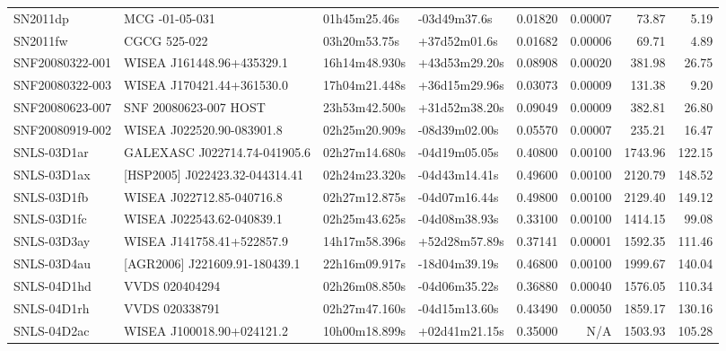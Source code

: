 \begin{longtable}{llllrrrr}
SN2011dp         &                  MCG -01-05-031 &    01h45m25.46s &    -03d49m37.6s &  0.01820 &  0.00007 &    73.87 &        5.19 \\
SN2011fw         &                    CGCG 525-022 &    03h20m53.75s &    +37d52m01.6s &  0.01682 &  0.00006 &    69.71 &        4.89 \\
SNF20080322-001  &       WISEA J161448.96+435329.1 &   16h14m48.930s &   +43d53m29.20s &  0.08908 &  0.00020 &   381.98 &       26.75 \\
SNF20080322-003  &       WISEA J170421.44+361530.0 &   17h04m21.448s &   +36d15m29.96s &  0.03073 &  0.00009 &   131.38 &        9.20 \\
SNF20080623-007  &           SNF 20080623-007 HOST &   23h53m42.500s &   +31d52m38.20s &  0.09049 &  0.00009 &   382.81 &       26.80 \\
SNF20080919-002  &       WISEA J022520.90-083901.8 &   02h25m20.909s &   -08d39m02.00s &  0.05570 &  0.00007 &   235.21 &       16.47 \\
SNLS-03D1ar      &  GALEXASC J022714.74-041905.6   &   02h27m14.680s &   -04d19m05.05s &  0.40800 &  0.00100 &  1743.96 &      122.15 \\
SNLS-03D1ax      &  [HSP2005] J022423.32-044314.41 &   02h24m23.320s &   -04d43m14.41s &  0.49600 &  0.00100 &  2120.79 &      148.52 \\
SNLS-03D1fb      &       WISEA J022712.85-040716.8 &   02h27m12.875s &   -04d07m16.44s &  0.49800 &  0.00100 &  2129.40 &      149.12 \\
SNLS-03D1fc      &       WISEA J022543.62-040839.1 &   02h25m43.625s &   -04d08m38.93s &  0.33100 &  0.00100 &  1414.15 &       99.08 \\
SNLS-03D3ay      &       WISEA J141758.41+522857.9 &   14h17m58.396s &   +52d28m57.89s &  0.37141 &  0.00001 &  1592.35 &      111.46 \\
SNLS-03D4au      &  [AGR2006] J221609.91-180439.1  &   22h16m09.917s &   -18d04m39.19s &  0.46800 &  0.00100 &  1999.67 &      140.04 \\
SNLS-04D1hd      &                  VVDS 020404294 &   02h26m08.850s &   -04d06m35.22s &  0.36880 &  0.00040 &  1576.05 &      110.34 \\
SNLS-04D1rh      &                  VVDS 020338791 &   02h27m47.160s &   -04d15m13.60s &  0.43490 &  0.00050 &  1859.17 &      130.16 \\
SNLS-04D2ac      &       WISEA J100018.90+024121.2 &   10h00m18.899s &   +02d41m21.15s &  0.35000 &      N/A &  1503.93 &      105.28 \\

\end{longtable}
